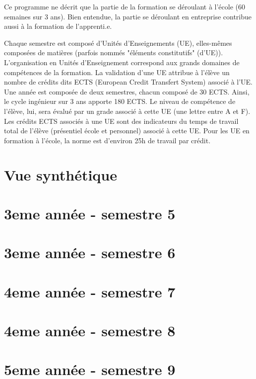 \documentclass[a4paper, 11pt]{article}
\begin{document}
Ce programme ne décrit que la partie de la formation se déroulant à l'école (60 semaines sur 3 ans). Bien entendue, la partie se déroulant en entreprise contribue aussi à la formation de l'apprenti.e.

Chaque semestre est composé d'Unités d'Enseignements (UE), elles-mêmes composées de matières (parfois nommés "éléments constitutifs" (d'UE)). L'organisation en Unités d'Enseignement correspond aux grands domaines de compétences de la formation. La validation d'une UE attribue à l'élève un nombre de crédits dits ECTS (European Credit Transfert System) associé à l'UE. Une année est composée de deux semestres, chacun composé de 30 ECTS. Ainsi, le cycle ingénieur sur 3 ans apporte 180 ECTS. Le niveau de compétence de l'élève, lui, sera évalué par un grade associé à cette UE (une lettre entre A et F). Les crédits ECTS associés à une UE sont des indicateurs du temps de travail total de l'élève (présentiel école et personnel) associé à cette UE. Pour les UE en formation à l'école, la norme est d'environ 25h de travail par crédit.  

\pagebreak

\tableofcontents
\pagebreak
\part{Vue synthétique}

\part{3eme année - semestre 5}





\part{3eme année - semestre 6}





\part{4eme année - semestre 7}





\part{4eme année - semestre 8}





\part{5eme année - semestre 9}




\end{document}

